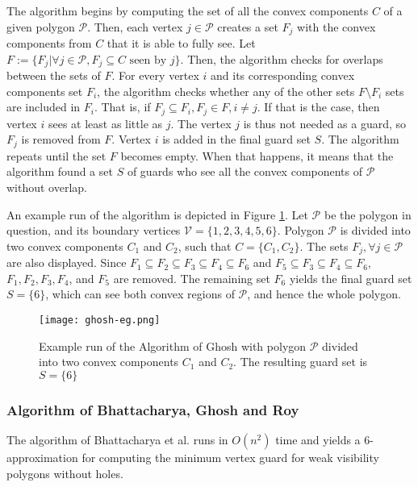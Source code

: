 The algorithm begins by computing the set of all the convex components $C$ of a given polygon $\mathcal P$. Then, each vertex $j \in \mathcal P$ creates a set $F_j$ with the convex components from $C$ that it is able to fully see. Let $F := \{F_j | \forall j \in \mathcal P, F_j \subseteq C \text{ seen by } j\}$. Then, the algorithm checks for overlaps between the sets of $F$. For every vertex $i$ and its corresponding convex components set $F_i$, the algorithm checks whether any of the other sets $F \setminus F_i$ sets are included in $F_i$. That is, if $F_j \subseteq F_i, F_j \in F, i \neq j$. If that is the case, then  vertex $i$ sees at least as little as $j$. The vertex $j$ is thus not needed as a guard, so $F_j$ is removed from $F$. Vertex $i$ is added in the final guard set $S$. The algorithm repeats until the set $F$ becomes empty. When that happens, it means that the algorithm found a set $S$ of guards who see all the convex components of $\mathcal P$ without overlap.


An example run of the algorithm is depicted in Figure \ref{fig:ghosh}. Let $\mathcal P$ be the polygon in question, and its boundary vertices $\mathcal V = \{1, 2, 3, 4, 5, 6\}$. Polygon $\mathcal P$ is divided into two convex components $C_1$ and $C_2$, such that $C = \{C_1, C_2\}$. The sets $F_j, \forall j \in \mathcal P$ are also displayed. Since $F_1 \subseteq F_2 \subseteq F_3 \subseteq F_4 \subseteq F_6$ and $F_5 \subseteq F_3 \subseteq F_4 \subseteq F_6$, $F_1, F_2, F_3, F_4$, and $F_5$ are removed. The remaining set $F_6$ yields the final guard set $S = \{6\}$, which can see both convex regions of $\mathcal P$, and hence the whole polygon.

\begin{figure}[h!]
    \centering
    \texttt{[image: ghosh-eg.png]}
    \caption{Example run of the Algorithm of Ghosh \cite{GHOSH2010718} with polygon $\mathcal P$ divided into two convex components $C_1$ and $C_2$. The resulting guard set is $S = \{6\}$}
    \label{fig:ghosh}
\end{figure}

\newpage
\subsubsection{Algorithm of Bhattacharya, Ghosh and Roy \cite{bhattacharya2016approximability}}
The algorithm of Bhattacharya et al. \cite{bhattacharya2016approximability} runs in $O(n^2)$ time and yields a 6-approximation for computing the minimum vertex guard for weak visibility polygons without holes. 

